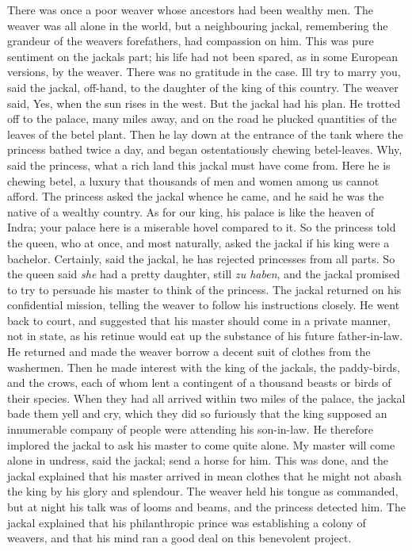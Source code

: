 \documentclass[14pt,a4paper]{memoir}
\begin{document}
{There was once a poor weaver whose ancestors had been wealthy men. The
weaver was all alone in the world, but a neighbouring jackal,
\textquotesingle remembering the grandeur of the
weaver\textquotesingle s forefathers, had compassion on
him.\textquotesingle{} This was pure sentiment on the
jackal\textquotesingle s part; his life had not been spared, as in some
European versions, by the weaver. There was no gratitude in the case.
\textquotesingle I\textquotesingle ll try to marry
you,\textquotesingle{} said the jackal, off-hand, \textquotesingle to
the daughter of the king of this country.\textquotesingle{} The weaver
said, \textquotesingle Yes, when the sun rises in the
west.\textquotesingle{} But the jackal had his plan. He trotted off to
the palace, many miles away, and on the road he plucked quantities of
the leaves of the betel plant. Then he lay down at the entrance of the
tank where the princess bathed twice a day, and began ostentatiously
chewing betel-leaves. \textquotesingle Why,\textquotesingle{} said the
princess, \textquotesingle what a rich land this jackal must have come
from. Here he is chewing betel, a luxury that thousands of men and women
among us cannot afford.\textquotesingle{} The princess asked the jackal
whence he came, and he said he was the native of a wealthy country.
\textquotesingle As for our king, his palace is like the heaven of
Indra; your palace here is a miserable hovel compared to
it.\textquotesingle{} So the princess told the queen, who at once, and
most naturally, asked the jackal if his king were a bachelor.
\textquotesingle Certainly,\textquotesingle{} said the jackal,
\textquotesingle he has rejected princesses from all
parts.\textquotesingle{} So the queen said \emph{she} had a pretty
daughter, still \emph{zu haben}, and the jackal promised to try to
persuade his master to think of the princess. The jackal returned on his
confidential mission, telling the weaver to follow his instructions
closely. He went back to court, and suggested that his master should
come in a private manner, not in state, as his retinue would eat up the
substance of his future father-in-law. He returned and made the weaver
borrow a decent suit of clothes from the washermen. Then he made
interest with the king of the jackals, the paddy-birds, and the crows,
each of whom lent a contingent of a thousand beasts or birds of their
species. When they had all arrived within two miles of the palace, the
jackal bade them yell and cry, which they did so furiously that the king
supposed an innumerable company of people were attending his son-in-law.
He therefore implored the jackal to ask his master to come quite alone.
\textquotesingle My master will come alone in undress,\textquotesingle{}
said the jackal; \textquotesingle send a horse for
him.\textquotesingle{} This was done, and the jackal explained that his
master arrived in mean clothes that he might not abash the king by his
glory and splendour. The weaver held his tongue as commanded, but at
night his talk was of looms and beams, and the princess detected him.
The jackal explained that his philanthropic prince was establishing a
colony of weavers, and that his mind ran a good deal on this benevolent
project.

}
\end{document}
